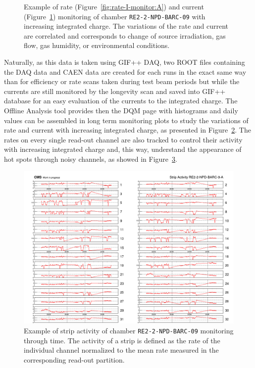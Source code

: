 \begin{figure}[H]
\begin{subfigure}{0.5\linewidth}
        	\caption{\label{fig:rate-I-monitor:B}}
    	\end{subfigure}
		\caption{\label{fig:rate-I-monitor} Example of rate (Figure~\ref{fig:rate-I-monitor:A}) and current (Figure~\ref{fig:rate-I-monitor:B}) monitoring of chamber \texttt{RE2-2-NPD-BARC-09} with increasing integrated charge. The variations of the rate and current are correlated and corresponds to change of source irradiation, gas flow, gas humidity, or environmental conditions.}
	\end{figure}
	
	Naturally, as this data is taken using GIF++ DAQ, two ROOT files containing the DAQ data and CAEN data are created for each runs in the exact same way than for efficiency or rate scans taken during test beam periods but while the currents are still monitored by the longevity scan and saved into GIF++ database for an easy evaluation of the currents to the integrated charge. The Offline Analysis tool provides then the DQM page with histograms and daily values can be assembled in long term monitoring plots to study the variations of rate and current with increasing integrated charge, as presented in Figure~\ref{fig:rate-I-monitor}. The rates on every single read-out channel are also tracked to control their activity with increasing integrated charge and, this way, understand the appearance of hot spots through noisy channels, as showed in Figure~\ref{fig:stripactivity}.

	\begin{figure}[H]
        \centering
		\includegraphics[width = \linewidth]{fig/chapt5/GIFpp-Strip-Activity.png}
		\caption{\label{fig:stripactivity} Example of strip activity of chamber \texttt{RE2-2-NPD-BARC-09} monitoring through time. The activity of a strip is defined as the rate of the individual channel normalized to the mean rate measured in the corresponding read-out partition.}
	\end{figure}
	
